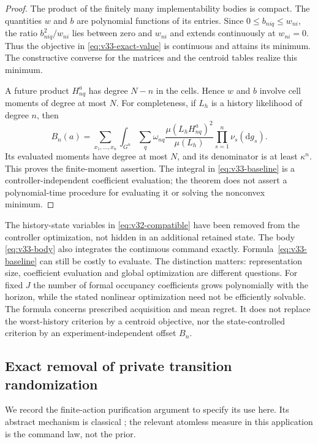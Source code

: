 \begin{proof}
The product of the finitely many implementability bodies is compact.
The quantities $w$ and $b$ are polynomial functions of its entries.
Since $0\le b_{niq}\le w_{ni}$, the ratio $b_{niq}^2/w_{ni}$ lies
between zero and $w_{ni}$ and extends continuously at $w_{ni}=0$.
Thus the objective in \eqref{eq:v33-exact-value} is continuous and
attains its minimum. The constructive converse for the matrices and
the centroid tables realize this minimum.

A future product $H^a_{nq}$ has degree $N-n$ in the cells. Hence $w$
and $b$ involve cell moments of degree at most $N$. For completeness,
if $L_h$ is a history likelihood of degree $n$, then
\begin{equation}\label{eq:v33-baseline}
 B_n(a)=\sum_{x_1,\ldots,x_n}\int_{G^n}\sum_q\omega_{nq}
       \frac{\mu(L_hH^a_{nq})^2}{\mu(L_h)}
               \prod_{s=1}^n\nu_s(\mathrm dg_s).
\end{equation}
Its evaluated moments have degree at most $N$, and its denominator
is at least $\kappa^n$. This proves the finite-moment assertion.
The integral in \eqref{eq:v33-baseline} is a controller-independent
coefficient evaluation; the theorem does not assert a polynomial-time
procedure for evaluating it or solving the nonconvex minimum.
\end{proof}

\begin{remark}\label{rem:v33-tree}
The history-state variables in \eqref{eq:v32-compatible} have been
removed from the controller optimization, not hidden in an additional
retained state. The body \eqref{eq:v33-body} also integrates the
continuous command exactly. Formula~\eqref{eq:v33-baseline} can still
be costly to evaluate. The distinction matters: representation size,
coefficient evaluation and global optimization are different questions.
For fixed $J$ the number of formal occupancy coefficients grows
polynomially with the horizon, while the stated nonlinear optimization
need not be efficiently solvable. The formula concerns prescribed
acquisition and mean regret. It does not replace the worst-history
criterion by a centroid objective, nor the state-controlled criterion
by an experiment-independent offset $B_n$.
\end{remark}

\subsection{Exact removal of private transition randomization}
We record the finite-action purification argument to specify its use
here. Its abstract mechanism is classical \cite{DWW1951}; the relevant
atomless measure in this application is the command law, not the prior.

